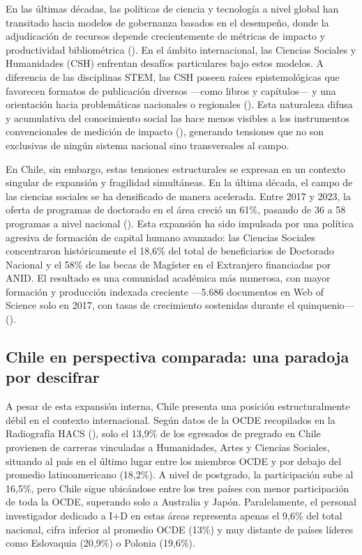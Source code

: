 \documentclass[
  12pt,
  letterpaper,
]{article}
\begin{document}
En las últimas décadas, las políticas de ciencia y tecnología a nivel
global han transitado hacia modelos de gobernanza basados en el
desempeño, donde la adjudicación de recursos depende crecientemente de
métricas de impacto y productividad bibliométrica
().
En el ámbito internacional, las Ciencias Sociales y Humanidades (CSH)
enfrentan desafíos particulares bajo estos modelos. A diferencia de las
disciplinas STEM, las CSH poseen raíces epistemológicas que favorecen
formatos de publicación diversos ---como libros y capítulos--- y una
orientación hacia problemáticas nacionales o regionales
(). Esta
naturaleza difusa y acumulativa del conocimiento social las hace menos
visibles a los instrumentos convencionales de medición de impacto
(), generando
tensiones que no son exclusivas de ningún sistema nacional sino
transversales al campo.

En Chile, sin embargo, estas tensiones estructurales se expresan en un
contexto singular de expansión y fragilidad simultáneas. En la última
década, el campo de las ciencias sociales se ha densificado de manera
acelerada. Entre 2017 y 2023, la oferta de programas de doctorado en el
área creció un 61\%, pasando de 36 a 58 programas a nivel nacional
(). Esta
expansión ha sido impulsada por una política agresiva de formación de
capital humano avanzado: las Ciencias Sociales concentraron
históricamente el 18,6\% del total de beneficiarios de Doctorado
Nacional y el 58\% de las becas de Magíster en el Extranjero financiadas
por ANID. El resultado es una comunidad académica más numerosa, con
mayor formación y producción indexada creciente ---5.686 documentos en
Web of Science solo en 2017, con tasas de crecimiento sostenidas durante
el quinquenio--- ().

\subsection{Chile en perspectiva comparada: una paradoja por
descifrar}\label{chile-en-perspectiva-comparada-una-paradoja-por-descifrar}

A pesar de esta expansión interna, Chile presenta una posición
estructuralmente débil en el contexto internacional. Según datos de la
OCDE recopilados en la Radiografía HACS
(), solo el
13,9\% de los egresados de pregrado en Chile provienen de carreras
vinculadas a Humanidades, Artes y Ciencias Sociales, situando al país en
el último lugar entre los miembros OCDE y por debajo del promedio
latinoamericano (18,2\%). A nivel de postgrado, la participación sube al
16,5\%, pero Chile sigue ubicándose entre los tres países con menor
participación de toda la OCDE, superando solo a Australia y Japón.
Paralelamente, el personal investigador dedicado a I+D en estas áreas
representa apenas el 9,6\% del total nacional, cifra inferior al
promedio OCDE (13\%) y muy distante de países líderes como Eslovaquia
(20,9\%) o Polonia (19,6\%).
\end{document}
